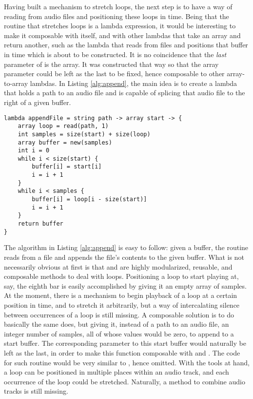 Having built a mechanism to stretch loops, the next step is to have a way of reading from audio files and positioning these loops in time. Being that the routine that stretches loops is a lambda expression, it would be interesting to make it composable with itself, and with other lambdas that take an array and return another, such as the lambda that reads from files and positions that buffer in time which is about to be constructed. It is no coincidence that the \emph{last} parameter of  is the array. It was constructed that way so that the array parameter could be left as the last to be fixed, hence composable to other array-to-array lambdas. In Listing \ref{alg:append}, the main idea is to create a lambda that holds a path to an audio file and is capable of splicing that audio file to the right of a given buffer.

\begin{lstlisting}[emph={lambda,string,array,read,int,size,new,while,return},emphstyle={\textbf},caption={Appending the contents of a file to a given buffer.},label={alg:append}]
lambda appendFile = string path -> array start -> {
	array loop = read(path, 1)
	int samples = size(start) + size(loop)
	array buffer = new(samples)
	int i = 0
	while i < size(start) {
		buffer[i] = start[i]
		i = i + 1
	}
	while i < samples {
		buffer[i] = loop[i - size(start)]
		i = i + 1
	}
	return buffer
}
\end{lstlisting}

The algorithm in Listing \ref{alg:append} is easy to follow: given a  buffer, the routine reads from a file and appends the file's contents to the given buffer. What is not necessarily obvious at first is that  and  are highly modularized, reusable, and composable methods to deal with loops. Positioning a loop to start playing at, say, the eighth bar is easily accomplished by giving it an empty array of  samples. At the moment, there is a mechanism to begin playback of a loop at a certain position in time, and to stretch it arbitrarily, but a way of intercalating silence between occurrences of a loop is still missing. A composable solution is to do basically the same  does, but giving it, instead of a path to an audio file, an integer number of samples, all of whose values would be zero, to append to a start buffer. The corresponding parameter to this start buffer would naturally be left as the last, in order to make this function composable with  and . The code for such  routine would be very similar to , hence omitted. With the tools at hand, a loop can be positioned in multiple places within an audio track, and each occurrence of the loop could be stretched. Naturally, a method to combine audio tracks is still missing.

